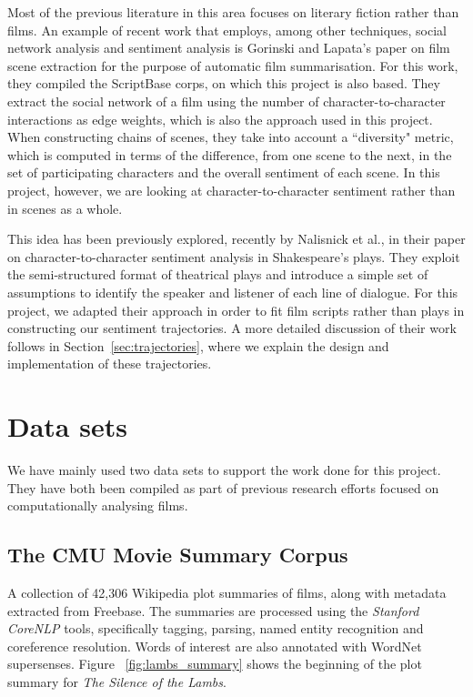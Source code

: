 \documentclass[bsc,frontabs,singlespacing,parskip, twoside]{infthesis}
\begin{document}
Most of the previous literature in this area focuses on literary fiction rather than films. An example of recent work that employs, among other techniques, social network analysis and sentiment analysis is Gorinski and Lapata's paper \cite{Gorinski2015} on film scene extraction for the purpose of automatic film summarisation. For this work, they compiled the ScriptBase corps, on which this project is also based. They extract the social network of a film using the number of character-to-character interactions as edge weights, which is also the approach used in this project. When constructing chains of scenes, they take into account a ``diversity" metric, which is computed in terms of the difference, from one scene to the next, in the set of participating characters and the overall sentiment of each scene. In this project, however, we are looking at character-to-character sentiment rather than in scenes as a whole.

This idea has been previously explored, recently by Nalisnick et al.\cite{Nalisnick2013}, in their paper on character-to-character sentiment analysis in Shakespeare's plays. They exploit the semi-structured format of theatrical plays and introduce a simple set of assumptions to identify the speaker and listener of each line of dialogue. For this project, we adapted their approach in order to fit film scripts rather than plays in constructing our sentiment trajectories. A more detailed discussion of their work follows in Section~\ref{sec:trajectories}, where we explain the design and implementation of these trajectories.

\section{Data sets} \label{sec:data sets}
We have mainly used two data sets to support the work done for this project. They have both been compiled as part of previous research efforts focused on computationally analysing films.

\subsection{The CMU Movie Summary Corpus}
A collection of 42,306 Wikipedia plot summaries of films, along with metadata extracted from Freebase. The summaries are processed using the \textit{Stanford CoreNLP} tools, specifically tagging, parsing, named entity recognition and coreference resolution. Words of interest are also annotated with WordNet supersenses. Figure~ \ref{fig:lambs_summary} shows the beginning of the plot summary for \textit{The Silence of the Lambs}.
\end{document}
